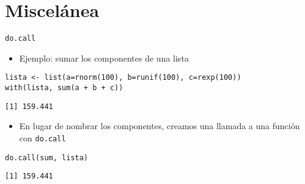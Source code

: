 \documentclass[xcolor={usenames,svgnames,dvipsnames}]{beamer}
\begin{document}
\section{Miscelánea}
\label{sec-4}
\begin{frame}[fragile,label=sec-4-1]{\texttt{do.call}}
 \begin{itemize}
\item Ejemplo: sumar los componentes de una lista
\end{itemize}
\lstset{language=R,numbers=none}
\begin{lstlisting}
lista <- list(a=rnorm(100), b=runif(100), c=rexp(100))
with(lista, sum(a + b + c))
\end{lstlisting}

\begin{verbatim}
[1] 159.441
\end{verbatim}

\begin{itemize}
\item En lugar de nombrar los componentes, creamos una llamada a una
función con \texttt{do.call}
\end{itemize}
\lstset{language=R,numbers=none}
\begin{lstlisting}
do.call(sum, lista)
\end{lstlisting}

\begin{verbatim}
[1] 159.441
\end{verbatim}
\end{frame}
\end{document}
